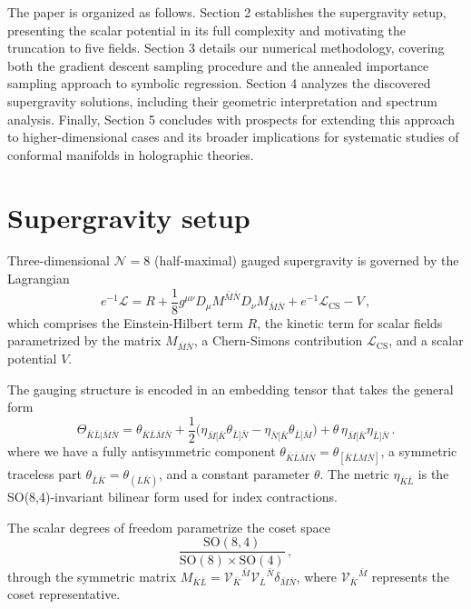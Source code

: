 \documentclass[11pt]{article}
\newcommand{\bK}{{\bar{K}}}
\newcommand{\bL}{{\bar{L}}}
\newcommand{\bM}{{\bar{M}}}
\newcommand{\bN}{{\bar{N}}}
\begin{document}
The paper is organized as follows. Section 2 establishes the supergravity setup, presenting the scalar potential in its full complexity and motivating the truncation to five fields. Section 3 details our numerical methodology, covering both the gradient descent sampling procedure and the annealed importance sampling approach to symbolic regression. Section 4 analyzes the discovered supergravity solutions, including their geometric interpretation and spectrum analysis. Finally, Section 5 concludes with prospects for extending this approach to higher-dimensional cases and its broader implications for systematic studies of conformal manifolds in holographic theories.

\section{Supergravity setup}
	
Three-dimensional $\mathcal{N}=8$ (half-maximal) gauged supergravity is governed by the Lagrangian
%
\begin{equation}	\label{eq: lagrangian_rephrased} 
	e^{-1}\mathcal{L}=R+\frac1{8}g^{\mu\nu}D_\mu M^{\bM\bN}D_\nu M_{\bM\bN}+e^{-1}\mathcal{L}_{\text{CS}}-V\,,
\end{equation}
%
which comprises the Einstein-Hilbert term $R$, the kinetic term for scalar fields parametrized by the matrix $M_{\bM\bN}$, a Chern-Simons contribution $\mathcal{L}_{\text{CS}}$, and a scalar potential $V$.

The gauging structure is encoded in an embedding tensor that takes the general form
%
\begin{equation}	\label{eq: embtensor_rephrased}
	\Theta_{\bK\bL\vert\bM\bN}=\theta_{\bK\bL\bM\bN}+\frac12\Big(\eta_{\bM[\bK}\theta_{\bL]\bN}-\eta_{\bN[\bK}\theta_{\bL]\bM}\Big)+\theta\,\eta_{\bM[\bK}\eta_{\bL]\bN}\,.
\end{equation}
%
where we have a fully antisymmetric component $\theta_{\bK\bL\bM\bN}=\theta_{[\bK\bL\bM\bN]}$, a symmetric traceless part $\theta_{\bL\bK}=\theta_{(\bL\bK)}$, and a constant parameter $\theta$. The metric $\eta_{\bK\bL}$ is the SO(8,4)-invariant bilinear form used for index contractions.

The scalar degrees of freedom parametrize the coset space
%
\begin{equation}	\label{eq: scalarcoset_rephrased}
	\frac{\text{SO}(8,4)}{\text{SO}(8)\times\text{SO}(4)}\,,
\end{equation}
%
through the symmetric matrix $M_{\bK\bL}=\mathcal{V}_{\bK}{}^{\bM}\mathcal{V}_{\bL}{}^{\bN}\delta_{\bM\bN}$, where $\mathcal{V}_{\bK}{}^{\bM}$ represents the coset representative. 
\end{document}
